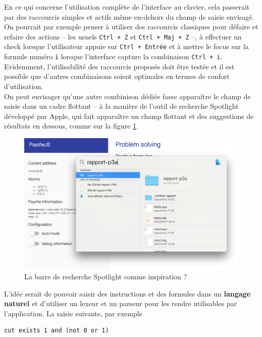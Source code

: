 En ce qui concerne l'utilisation complète de l'interface au clavier, cela passerait par des raccourcis simples et actifs même en-dehors du champ de saisie envisagé. On pourrait par exemple penser à utiliser des raccourcis classiques pour défaire et refaire des actions -- les usuels \texttt{Ctrl + Z} et \texttt{Ctrl + Maj + Z} --, à effectuer un check lorsque l'utilisateur appuie sur \texttt{Ctrl + Entrée} et à mettre le focus sur la formule numéro \texttt{i} lorsque l'interface capture la combinaison \texttt{Ctrl + i}. Evidemment, l'utilisabilité des raccourcis proposés doit être testée et il est possible que d'autres combinaisons soient optimales en termes de confort d'utilisation.\\

On peut envisager qu'une autre combinison dédiée fasse apparaître le champ de saisie dans un cadre flottant -- à la manière de l'outil de recherche Spotlight développé par Apple, qui fait apparaître un champ flottant et des suggestions de résultats en dessous, comme sur la figure \ref{spotlight}.

\begin{figure}[!ht]
    \center
    \includegraphics[width=1\textwidth]{./images/III_2_spotlight.png}
    \caption{\label{spotlight} La barre de recherche Spotlight comme inspiration ?}
\end{figure}

L'idée serait de pouvoir saisir des instructions et des formules dans un \textbf{langage naturel} et d'utiliser un lexeur et un parseur pour les rendre utilisables par l'application. La saisie suivante, par exemple

\begin{verbatim}
cut exists 1 and (not 0 or 1)
\end{verbatim}

